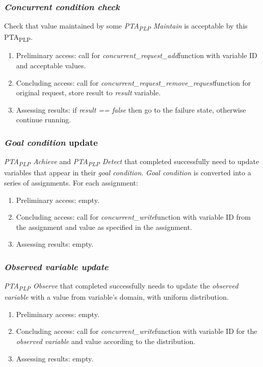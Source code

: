 \subsubsection{\textit{\textit{Concurrent condition} check} \label{memory_module_applications_concurrent_condition_check}}
Check that value maintained by some \textit{PTA\textsubscript{PLP} Maintain} is acceptable by this PTA\textsubscript{PLP}.
\begin{enumerate} 
\item Preliminary access: call for \textcolor{ColorUppaalFunction}{\textit{concurrent_request_add}}​ function with variable ID and acceptable values. 
\item Concluding access: call for \textcolor{ColorUppaalFunction}{\textit{concurrent_request_remove_request}}​ function for original request, store result to \textcolor{ColorEdgeGuard}{\textit{result}} variable. 
\item Assessing results: if \textcolor{ColorEdgeGuard}{\textit{result == false}} then go to the failure state, otherwise continue running.
\end{enumerate}  
\subsubsection{\textit{\textit{Goal condition}} update \label{memory_module_applications_goal_condition_update}}
\textit{PTA\textsubscript{PLP} Achieve} and \textit{PTA\textsubscript{PLP} Detect} that completed successfully need to update variables that appear in their \textit{\textit{goal condition}}. \textit{\textit{Goal condition}} is converted into a series of assignments. For each assignment:
\begin{enumerate} 
\item Preliminary access: empty.
\item Concluding access: call for \textcolor{ColorUppaalFunction}{\textit{concurrent_write}}​ function with variable ID from the assignment and value as specified in the assignment. 
\item Assessing results: empty.
\end{enumerate}
\subsubsection{\textit{\textit{Observed variable} update} \label{memory_module_applications_observed_variable_update}}
\textit{PTA\textsubscript{PLP} Observe} that completed successfully needs to update the \textit{observed variable} with a value from variable’s domain, with uniform distribution.
\begin{enumerate} 
\item Preliminary access: empty.
\item Concluding access: call for \textcolor{ColorUppaalFunction}{\textit{concurrent_write}}​ function with variable ID for the \textit{observed variable} and value according to the distribution. 
\item Assessing results: empty.
\end{enumerate}

